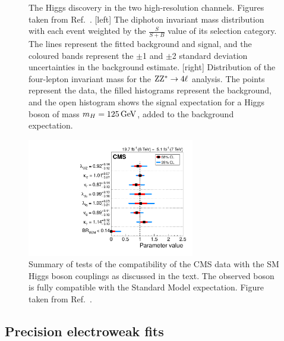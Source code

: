 \begin{figure}[p]
  \caption{The Higgs discovery in the two high-resolution channels. Figures taken from
Ref.~\cite{Chatrchyan:2012ufa}.
  [left] The diphoton invariant mass distribution with each event weighted by the
$\frac{S}{S+B}$ value of its selection category. The lines represent the fitted background and
signal, and the coloured bands represent the $\pm$1 and $\pm$2 standard deviation uncertainties in
the background estimate. 
  [right] Distribution of the four-lepton invariant mass for the $\mathrm{Z}\mathrm{Z}^* \rightarrow 4\ell$
analysis. The points represent the data, the filled histograms represent the background, and the
open histogram shows the signal expectation for a Higgs boson of mass $m_H = 125\,\text{Ge\hspace{-.08em}V}$, added to the
background expectation.
  \label{fig:higgs_discovery}}
\end{figure}

\begin{figure}[p]
  \centering
  \vspace{1ex}
  \includegraphics[width=0.65\textwidth]{figures/standardmodel/sqr_summary_lhcxswg}
  \caption{ Summary of tests of the compatibility of the CMS data with the SM Higgs boson
couplings as discussed in the text.
The observed boson is fully compatible with the Standard Model expectation. Figure taken
from Ref.~\cite{Khachatryan:2014jba}.
  \label{fig:higgs_sm_test}}
\end{figure}


\subsection{Precision electroweak fits}

